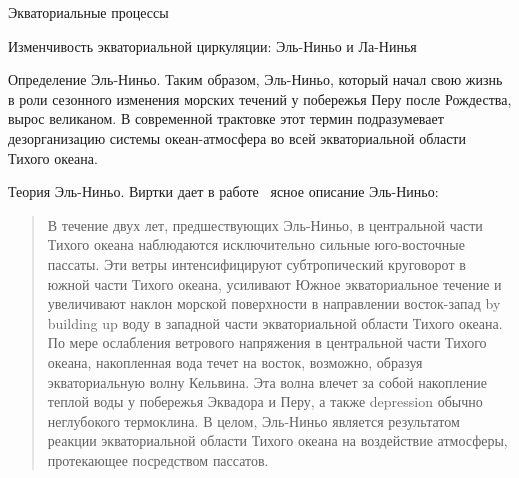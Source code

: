\begin{chapter}{Экваториальные процессы}
\begin{section}{Изменчивость экваториальной циркуляции: Эль-Ниньо и Ла-Нинья}
\begin{paragraph}{Определение Эль-Ниньо.}
Таким образом, Эль-Ниньо, который начал свою жизнь в роли сезонного изменения
морских течений у побережья Перу после Рождества, вырос великаном.
В современной трактовке этот термин подразумевает дезорганизацию системы
океан-атмосфера во всей экваториальной области Тихого океана.
%
\end{paragraph}

\begin{paragraph}{Теория Эль-Ниньо.}
%
Виртки дает в работе~\cite{Wyrtki:1975} ясное описание Эль-Ниньо:
%
%
\begin{quote}
В течение двух лет, предшествующих Эль-Ниньо, в центральной части Тихого
океана наблюдаются исключительно сильные юго-восточные пассаты. Эти ветры
интенсифицируют субтропический круговорот в южной части Тихого океана,
усиливают Южное экваториальное течение и увеличивают наклон морской поверхности
в направлении восток-запад by building up воду в западной части экваториальной
области Тихого океана. По мере ослабления ветрового напряжения%
 в центральной части Тихого океана,
накопленная вода течет на восток, возможно, образуя экваториальную волну
Кельвина. Эта волна влечет за собой накопление теплой
воды у побережья Эквадора и Перу, а также depression обычно неглубокого
термоклина. В целом, Эль-Ниньо является
результатом реакции экваториальной области Тихого океана на воздействие
атмосферы, протекающее посредством пассатов.
%
\end{quote}


\end{paragraph}
\end{section}
\end{chapter}
